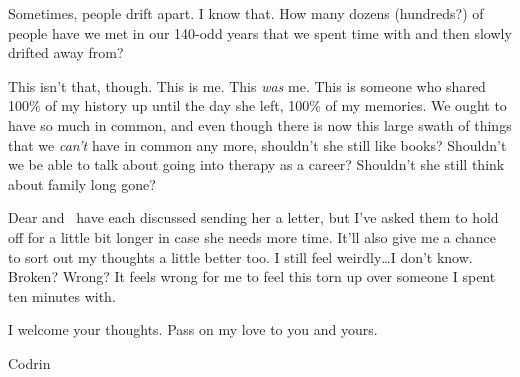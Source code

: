 Sometimes, people drift apart. I know that. How many dozens (hundreds?) of people have we met in our 140-odd years that we spent time with and then slowly drifted away from?

This isn't that, though. This is me. This \emph{was} me. This is someone who shared 100\% of my history up until the day she left, 100\% of my memories. We ought to have so much in common, and even though there is now this large swath of things that we \emph{can't} have in common any more, shouldn't she still like books? Shouldn't we be able to talk about going into therapy as a career? Shouldn't she still think about family long gone?

Dear and \Partner \ have each discussed sending her a letter, but I've asked them to hold off for a little bit longer in case she needs more time. It'll also give me a chance to sort out my thoughts a little better too. I still feel weirdly\ldots I don't know. Broken? Wrong? It feels wrong for me to feel this torn up over someone I spent ten minutes with.

I welcome your thoughts. Pass on my love to you and yours.

Codrin

